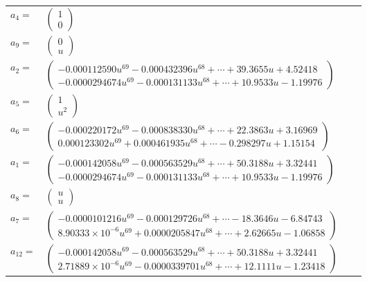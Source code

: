 \documentclass[1p]{elsarticle_modified}
\theoremstyle{definition}
\begin{document}
\begin{tabular}{m{7pt} m{180pt} m{7pt} m{180pt} }
\flushright $a_{4}=$&$\begin{pmatrix}1\\0\end{pmatrix}$ \\
\flushright $a_{9}=$&$\begin{pmatrix}0\\u\end{pmatrix}$ \\
\flushright $a_{2}=$&$\begin{pmatrix}-0.000112590 u^{69}-0.000432396 u^{68}+\cdots+39.3655 u+4.52418\\-0.0000294674 u^{69}-0.000131133 u^{68}+\cdots+10.9533 u-1.19976\end{pmatrix}$ \\
\flushright $a_{5}=$&$\begin{pmatrix}1\\u^2\end{pmatrix}$ \\
\flushright $a_{6}=$&$\begin{pmatrix}-0.000220172 u^{69}-0.000838330 u^{68}+\cdots+22.3863 u+3.16969\\0.000123302 u^{69}+0.000461935 u^{68}+\cdots-0.298297 u+1.15154\end{pmatrix}$ \\
\flushright $a_{1}=$&$\begin{pmatrix}-0.000142058 u^{69}-0.000563529 u^{68}+\cdots+50.3188 u+3.32441\\-0.0000294674 u^{69}-0.000131133 u^{68}+\cdots+10.9533 u-1.19976\end{pmatrix}$ \\
\flushright $a_{8}=$&$\begin{pmatrix}u\\u\end{pmatrix}$ \\
\flushright $a_{7}=$&$\begin{pmatrix}-0.0000101216 u^{69}-0.000129726 u^{68}+\cdots-18.3646 u-6.84743\\8.90333\times10^{-6} u^{69}+0.0000205847 u^{68}+\cdots+2.62665 u-1.06858\end{pmatrix}$ \\
\flushright $a_{12}=$&$\begin{pmatrix}-0.000142058 u^{69}-0.000563529 u^{68}+\cdots+50.3188 u+3.32441\\2.71889\times10^{-6} u^{69}-0.0000339701 u^{68}+\cdots+12.1111 u-1.23418\end{pmatrix}$ \\

\end{tabular}
\end{document}
